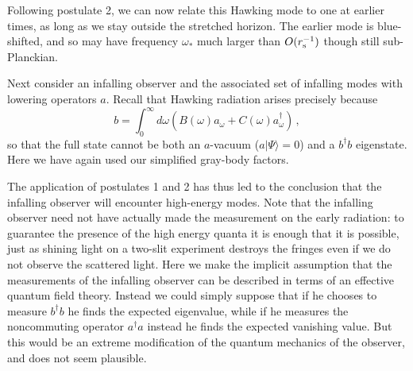 \documentclass[12pt]{article}
\begin{document}
Following postulate 2, we can now relate this Hawking mode to one at earlier times, as long as we stay  outside the stretched horizon.  The earlier mode is blue-shifted, and so may have frequency $\omega_*$ much larger than $O(r_{\rm s}^{-1})$ though still sub-Planckian.


Next consider an infalling observer and the associated set of infalling modes with lowering operators $a$.  Recall that Hawking radiation arises precisely because
\begin{equation}
\label{bog}
b =  \int_0^\infty d\omega \left(B(\omega) a_\omega +  C(\omega)  a^\dagger_\omega
 \right)\,,
\end{equation}
so that the full state  cannot be
  both an $a$-vacuum ($a  |\Psi\rangle =0$) and a $b^\dagger b$ eigenstate.  Here we have again used our simplified gray-body factors.

The application of postulates 1 and 2 has {thus} led to the conclusion that the infalling
observer will encounter high-energy modes.
Note that the infalling observer need not have actually made the measurement on the early radiation:  to guarantee the presence of the high energy quanta it is enough that it is possible, just as shining light on a two-slit experiment destroys the fringes even if we do not observe the scattered light.
{Here we make the implicit assumption that the measurements of the infalling observer can be described in terms of an effective quantum field theory.  Instead we could simply suppose that if he chooses to measure $b^\dagger b$ he finds the expected eigenvalue, while if he measures the noncommuting operator $a^\dagger a$ instead he finds the expected vanishing value.  But this would be an extreme modification of the quantum mechanics of the observer, and does not seem plausible.}
\end{document}
